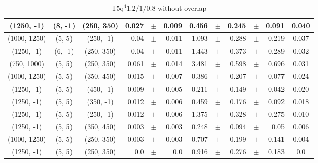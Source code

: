 \documentclass[12pt]{paper}
\newcommand{\TFiveqqqqHM}{\ensuremath{\textrm{T5q}^{4} 1.2/1/0.8}\xspace}
\begin{document}
\begin{table}[ht]
\begin{center}
{\begin{tabular}{|c|c|c|rrr|rrrrr|c|}
(1250, -1)&(8, -1)&(250, 350)&0.027&$\pm$&0.009&0.456&$\pm$&0.245&$\pm$&0.091&0.040\\\hline
(1000, 1250)&(5, 5)&(250, -1)&0.04&$\pm$&0.011&1.093&$\pm$&0.288&$\pm$&0.219&0.037\\\hline
(1250, -1)&(6, -1)&(250, 350)&0.04&$\pm$&0.011&1.443&$\pm$&0.373&$\pm$&0.289&0.032\\\hline
(750, 1000)&(5, 5)&(250, 350)&0.061&$\pm$&0.014&3.481&$\pm$&0.598&$\pm$&0.696&0.031\\\hline
(1000, 1250)&(5, 5)&(350, 450)&0.015&$\pm$&0.007&0.386&$\pm$&0.207&$\pm$&0.077&0.024\\\hline
(1250, -1)&(5, 5)&(450, -1)&0.009&$\pm$&0.005&0.211&$\pm$&0.149&$\pm$&0.042&0.020\\\hline
(1250, -1)&(5, 5)&(350, -1)&0.012&$\pm$&0.006&0.459&$\pm$&0.176&$\pm$&0.092&0.018\\\hline
(1250, -1)&(5, 5)&(250, -1)&0.012&$\pm$&0.006&1.375&$\pm$&0.328&$\pm$&0.275&0.010\\\hline
(1250, -1)&(5, 5)&(350, 450)&0.003&$\pm$&0.003&0.248&$\pm$&0.094&$\pm$&0.05&0.006\\\hline
(1000, 1250)&(5, 5)&(250, 350)&0.003&$\pm$&0.003&0.707&$\pm$&0.199&$\pm$&0.141&0.004\\\hline
(1250, -1)&(5, 5)&(250, 350)&0.0&$\pm$&0.0&0.916&$\pm$&0.276&$\pm$&0.183&0.0\\\hline
\end{tabular}}\end{center}\caption{\TFiveqqqqHM without overlap}\end{table}
\end{document}
